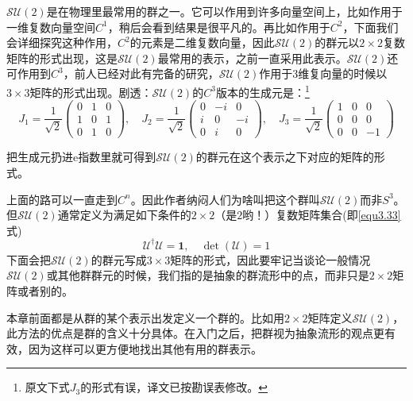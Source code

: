 $\mathcal{SU}(2)$是在物理里最常用的群之一。它可以作用到许多向量空间上，比如作用于一维复数向量空间$C^1$，稍后会看到结果是很平凡的。再比如作用于$C^2$，下面我们会详细探究这种作用，$C^2$的元素是二维复数向量，因此$\mathcal{SU}(2)$的群元以$2 \times 2$复数矩阵的形式出现，这是$\mathcal{SU}(2)$最常用的表示，之前一直采用此表示。$\mathcal{SU}(2)$还可作用到$C^3$，前人已经对此有完备的研究，$\mathcal{SU}(2)$作用于$3$维复向量的时候以$3 \times 3$矩阵的形式出现。剧透：$\mathcal{SU}(2)$的$C^3$版本的生成元是：\footnote{原文下式$J_3$的形式有误，译文已按勘误表修改。}
\begin{equation}
\label{equ3.87}
J_1 = \frac{1}{\sqrt{2}}
	\begin{pmatrix}
		0 & 1 & 0 \\
		1 & 0 & 1 \\
		0 & 1 & 0
	\end{pmatrix}
, \quad
J_2 = \frac{1}{\sqrt{2}}
	\begin{pmatrix}
		0 & -i & 0 \\
		i & 0 & -i \\
		0 & i & 0
	\end{pmatrix}
, \quad
J_3 = \frac{1}{\sqrt{2}}
	\begin{pmatrix}
		1 & 0 & 0 \\
		0 & 0 & 0 \\
		0 & 0 & -1
	\end{pmatrix}
\end{equation}

把生成元扔进$\mathrm{e}$指数里就可得到$\mathcal{SU}(2)$的群元在这个表示之下对应的矩阵的形式。

上面的路可以一直走到$C^n$。因此作者纳闷人们为啥叫把这个群叫$\mathcal{SU}(2)$而非$S^3$。但$\mathcal{SU}(2)$通常定义为满足如下条件的$2 \times 2$（是$2$哟！）复数矩阵集合(即\eqref{equ3.33}式)
\begin{equation}
\label{equ3.88}
\mathcal{U}^\dag \mathcal{U} = \mathbf{1}, \quad \det (\mathcal{U}) = 1
\end{equation}
下面会把$\mathcal{SU}(2)$的群元写成$3 \times 3$矩阵的形式，因此要牢记当谈论一般情况$\mathcal{SU}(2)$或其他群群元的时候，我们指的是抽象的群流形中的点，而非只是$2 \times 2$矩阵或者别的。

本章前面都是从群的某个表示出发定义一个群的。比如用$2 \times 2$矩阵定义$\mathcal{SU}(2)$，此方法的优点是群的含义十分具体。在入门之后，把群视为抽象流形的观点更有效，因为这样可以更方便地找出其他有用的群表示。

